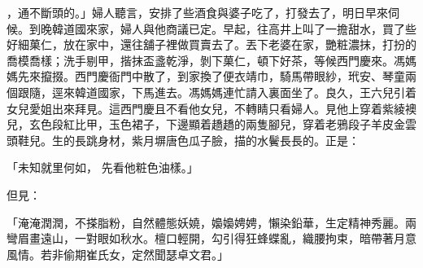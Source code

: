，通不斷頭的。」婦人聽言，安排了些酒食與婆子吃了，打發去了，明日早來伺候。到晚韓道國來家，婦人與他商議已定。早起，往高井上叫了一擔甜水，買了些好細菓仁，放在家中，還往舖子裡做買賣去了。丟下老婆在家，艷粧濃抹，打扮的喬模喬樣；洗手剔甲，揩抹盃盞乾淨，剝下菓仁，頓下好茶，等候西門慶來。馮媽媽先來攛掇。西門慶衙門中散了，到家換了便衣靖巾，騎馬帶眼紗，玳安、琴童兩個跟隨，逕來韓道國家，下馬進去。馮媽媽連忙請入裏面坐了。良久，王六兒引着女兒愛姐出來拜見。這西門慶且不看他女兒，不轉睛只看婦人。見他上穿着紫綾襖兒，玄色段紅比甲，玉色裙子，下邊顯着趫趫的兩隻腳兒，穿着老鴉段子羊皮金雲頭鞋兒。生的長跳身材，紫月塀唐色瓜子臉，描的水鬢長長的。正是：

「未知就里何如，  先看他粧色油樣。」

但見：

「淹淹潤潤，不搽脂粉，自然體態妖嬈，嬝嬝娉娉，懶染鉛華，生定精神秀麗。兩彎眉畫遠山，一對眼如秋水。檀口輕開，勾引得狂蜂蝶亂，織腰拘束，暗帶著月意風情。若非偷期崔氏女，定然聞瑟卓文君。」

